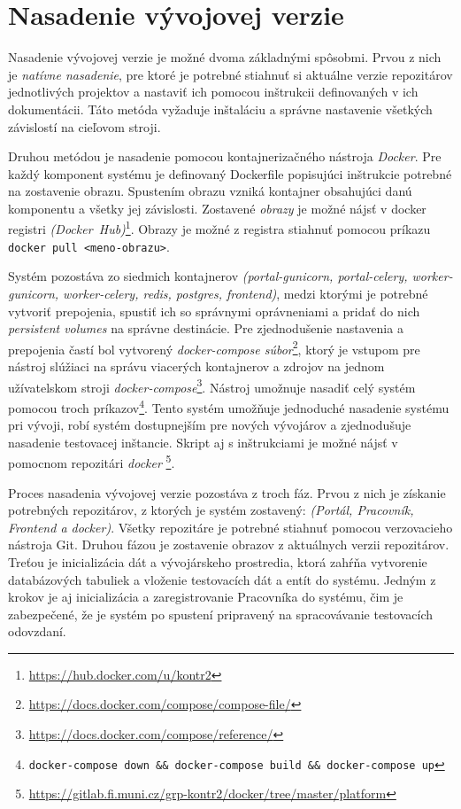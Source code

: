 \documentclass[
  digital, %
  oneside, %
  table,   %
  lof,     %
  lot,   %
]{fithesis3}
\begin{document}
\section{Nasadenie vývojovej verzie}

Nasadenie vývojovej verzie je možné dvoma základnými spôsobmi. Prvou z nich je \emph{natívne nasadenie}, pre ktoré je potrebné stiahnuť si aktuálne verzie repozitárov jednotlivých projektov a nastaviť ich pomocou inštrukcii definovaných v ich dokumentácii. Táto metóda vyžaduje inštaláciu a správne nastavenie všetkých závislostí na cieľovom stroji.

Druhou metódou je nasadenie pomocou kontajnerizačného nástroja \emph{Docker}. Pre každý komponent systému je definovaný Dockerfile popisujúci inštrukcie potrebné na zostavenie obrazu. Spustením obrazu vzniká kontajner obsahujúci danú komponentu a všetky jej závislosti. Zostavené \emph{obrazy} je možné nájsť v docker registri \emph{(Docker~Hub)}\footnote{\url{https://hub.docker.com/u/kontr2}}. Obrazy je možné z registra stiahnuť pomocou príkazu \texttt{docker pull <meno-obrazu>}.

Systém pozostáva zo siedmich kontajnerov \emph{(portal-gunicorn, portal-celery, worker-gunicorn, worker-celery, redis, postgres, frontend)}, medzi ktorými je potrebné vytvoriť prepojenia, spustiť ich so správnymi oprávneniami a pridať do nich \emph{persistent volumes} na správne destinácie. Pre zjednodušenie nastavenia a prepojenia častí bol vytvorený \emph{docker-compose súbor}\footnote{\url{https://docs.docker.com/compose/compose-file/}}, ktorý je vstupom pre nástroj slúžiaci na správu viacerých kontajnerov a zdrojov na jednom užívatelskom stroji \emph{docker-compose}\footnote{\url{https://docs.docker.com/compose/reference/}}. Nástroj umožnuje nasadiť celý systém pomocou troch príkazov\footnote{\texttt{docker-compose down \&\& docker-compose build \&\& docker-compose up}}. Tento systém umožňuje jednoduché nasadenie systému pri vývoji, robí systém dostupnejším pre nových vývojárov a zjednodušuje nasadenie testovacej inštancie. Skript aj s inštrukciami je možné nájsť v pomocnom repozitári \emph{docker} \footnote{\url{https://gitlab.fi.muni.cz/grp-kontr2/docker/tree/master/platform}}.

Proces nasadenia vývojovej verzie pozostáva z troch fáz. Prvou z nich je získanie potrebných repozitárov, z ktorých je systém zostavený: \emph{(Portál, Pracovník, Frontend a docker)}. Všetky repozitáre je potrebné stiahnuť pomocou verzovacieho nástroja Git. Druhou fázou je zostavenie obrazov z aktuálnych verzii repozitárov. Treťou je inicializácia dát a vývojárskeho prostredia, ktorá zahŕňa vytvorenie databázových tabuliek a vloženie testovacích dát a entít do systému. Jedným z krokov je aj inicializácia a zaregistrovanie Pracovníka do systému, čim je zabezpečené, že je systém po spustení pripravený na spracovávanie testovacích odovzdaní.
\end{document}

